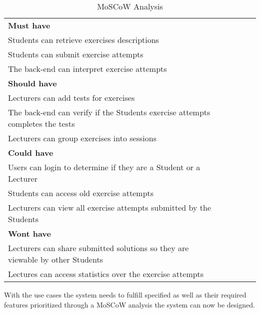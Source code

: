\begin{table}[H]
\begin{center}
    \begin{tabular}{|l|llll}
    \cline{1-1}
    \cellcolor[HTML]{C0C0C0}\textbf{Must have}                                      &  &  &  &  \\ \cline{1-1}
    Students can retrieve exercises descriptions                                    &  &  &  &  \\ \cline{1-1}
    Students can submit exercise attempts                                           &  &  &  &  \\ \cline{1-1}
    The back-end can interpret exercise attempts                                    &  &  &  &  \\ \cline{1-1}
    \cellcolor[HTML]{C0C0C0}\textbf{Should have}                                    &  &  &  &  \\ \cline{1-1}
    Lecturers can add tests for exercises                                           &  &  &  &  \\ \cline{1-1}
    The back-end can verify if the Students exercise attempts completes the tests   &  &  &  &  \\ \cline{1-1}
    Lecturers can group exercises into sessions                                     &  &  &  &  \\ \cline{1-1}
    \cellcolor[HTML]{C0C0C0}\textbf{Could have}                                     &  &  &  &  \\ \cline{1-1}
    Users can login to determine if they are a Student or a Lecturer                &  &  &  &  \\ \cline{1-1}
    Students can access old exercise attempts                                       &  &  &  &  \\ \cline{1-1}
    Lecturers can view all exercise attempts submitted by the Students              &  &  &  &  \\ \cline{1-1}
    \cellcolor[HTML]{C0C0C0}\textbf{Wont have}                                      &  &  &  &  \\ \cline{1-1}
    Lecturers can share submitted solutions so they are viewable by other Students  &  &  &  &  \\ \cline{1-1}
    Lectures can access statistics over the exercise attempts                       &  &  &  &  \\ \cline{1-1}
    \end{tabular}
    \caption{\label{tab:MOSCOW}MoSCoW Analysis}
\end{center}
\end{table}

With the use cases the system needs to fulfill specified as well as their required features prioritized through a MoSCoW analysis the system can now be designed. 
    

